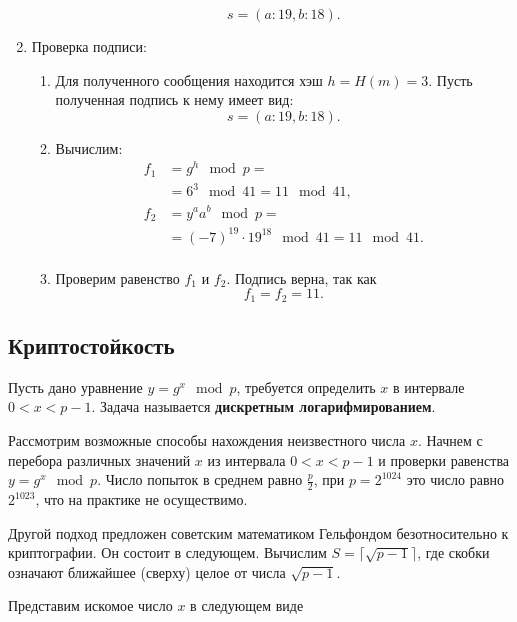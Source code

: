 \begin{enumerate}
\begin{enumerate}
                \[ s = (a:19, b:18). \]
        \end{enumerate}
    \item Проверка подписи:
        \begin{enumerate}
            \item Для полученного сообщения находится хэш $h = H(m) = 3$. Пусть полученная подпись к нему имеет вид:
                \[ s = (a:19, b:18). \]
            \item Вычислим:
                \[ \begin{array}{ll}
                    f_1 & = g^h \mod p = \\
                        & = 6^3 \mod 41 = 11 \mod 41, \\
                    f_2 & = y^a a^b \mod p = \\
                        & = (-7)^{19} \cdot 19^{18} \mod 41 = 11 \mod 41. \\
                \end{array} \]
            \item Проверим равенство $f_1$ и $f_2$. Подпись верна, так как
                \[ f_1 = f_2 = 11. \]
        \end{enumerate}
\end{enumerate}

\exampleend
{}

\subsection{Криптостойкость}

Пусть дано уравнение $y=g^{x} \mod p$, требуется определить $x$ в интервале $0 < x < p-1$. Задача называется \textbf{дискретным логарифмированием}.

Рассмотрим возможные способы нахождения неизвестного числа $x$. Начнем с перебора различных значений $x$ из интервала $0<x<p-1$ и проверки равенства $y=g^{x} \mod p$. Число попыток в среднем равно $\frac{p}{2}$, при $p=2^{1024}$ это число равно $2^{1023}$, что на практике не осуществимо.

Другой подход предложен советским математиком Гельфондом безотносительно к криптографии. Он состоит в следующем.
Вычислим $S=\lceil\sqrt{p-1}\rceil $, где скобки означают ближайшее (сверху) целое от числа $\sqrt{p-1} $.

Представим искомое число $x$   в следующем виде

